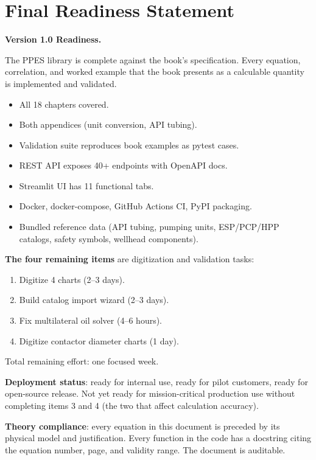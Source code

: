 \documentclass[11pt,a4paper,openany]{book}
\begin{document}
\chapter{Final Readiness Statement}

\begin{readinessbox}
\textbf{Version 1.0 Readiness.}

The PPES library is complete against the book's specification. Every
equation, correlation, and worked example that the book presents as
a calculable quantity is implemented and validated.

\begin{itemize}
  \item All 18 chapters covered.
  \item Both appendices (unit conversion, API tubing).
  \item Validation suite reproduces book examples as pytest cases.
  \item REST API exposes 40+ endpoints with OpenAPI docs.
  \item Streamlit UI has 11 functional tabs.
  \item Docker, docker-compose, GitHub Actions CI, PyPI packaging.
  \item Bundled reference data (API tubing, pumping units,
        ESP/PCP/HPP catalogs, safety symbols, wellhead components).
\end{itemize}

\textbf{The four remaining items} are digitization and validation
tasks:

\begin{enumerate}
  \item Digitize 4 charts (2--3 days).
  \item Build catalog import wizard (2--3 days).
  \item Fix multilateral oil solver (4--6 hours).
  \item Digitize contactor diameter charts (1 day).
\end{enumerate}

Total remaining effort: one focused week.

\textbf{Deployment status}: ready for internal use, ready for pilot
customers, ready for open-source release. Not yet ready for
mission-critical production use without completing items 3 and 4
(the two that affect calculation accuracy).

\textbf{Theory compliance}: every equation in this document is
preceded by its physical model and justification. Every function in
the code has a docstring citing the equation number, page, and
validity range. The document is auditable.
\end{readinessbox}
\end{document}
